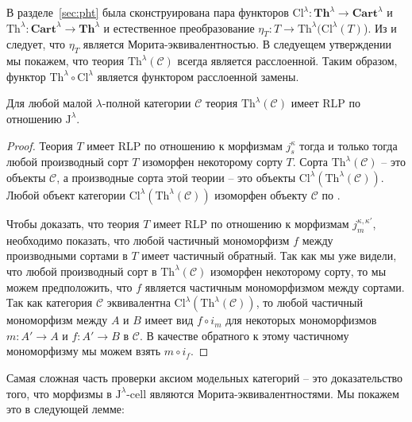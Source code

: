 \documentclass[reqno]{amsart}
\theoremstyle{definition}
\theoremstyle{remark}
\newcommand{\bcat}[1]{\mathbf{#1}}
\newcommand{\cat}[1]{\mathcal{#1}}
\newcommand{\fs}[1]{\mathrm{#1}}
\newcommand{\Th}{\bcat{Th}}
\newcommand{\I}{\mathrm{I}}
\newcommand{\J}{\mathrm{J}}
\newcommand{\class}[2]{#1\text{-}\mathrm{#2}}
\newcommand{\Icell}[1][\I]{\class{#1}{cell}}
\begin{document}
В разделе~\ref{sec:pht} была сконструирована пара функторов $\fs{Cl}^\lambda : \Th^\lambda \to \bcat{Cart}^\lambda$ и $\fs{Th}^\lambda : \bcat{Cart}^\lambda \to \Th^\lambda$ и естественное преобразование $\eta_T : T \to \fs{Th}^\lambda(\fs{Cl}^\lambda(T)$).
Из  и  следует, что $\eta_T$ является Морита-эквивалентностью.
В следуещем утверждении мы покажем, что теория $\fs{Th}^\lambda(\cat{C})$ всегда является расслоенной.
Таким образом, функтор $\fs{Th}^\lambda \circ \fs{Cl}^\lambda$ является функтором расслоенной замены.

\begin{prop}[th-fib]
Для любой малой $\lambda$-полной категории $\cat{C}$ теория $\fs{Th}^\lambda(\cat{C})$ имеет RLP по отношению $\J^\lambda$.
\end{prop}
\begin{proof}
Теория $T$ имеет RLP по отношению к морфизмам $j^\kappa_s$ тогда и только тогда любой производный сорт $T$ изоморфен некоторому сорту $T$.
Сорта $\fs{Th}^\lambda(\cat{C})$ -- это объекты $\cat{C}$, а производные сорта этой теории -- это объекты $\fs{Cl}^\lambda(\fs{Th}^\lambda(\cat{C}))$.
Любой объект категории $\fs{Cl}^\lambda(\fs{Th}^\lambda(\cat{C}))$ изоморфен объекту $\cat{C}$ по .

Чтобы доказать, что теория $T$ имеет RLP по отношению к морфизмам $j_m^{\kappa,\kappa'}$, необходимо показать, что любой частичный мономорфизм $f$ между производными сортами в $T$ имеет частичный обратный.
Так как мы уже видели, что любой производный сорт в $\fs{Th}^\lambda(\cat{C})$ изоморфен некоторому сорту, то мы можем предположить, что $f$ является частичным мономорфизмом между сортами.
Так как категория $\cat{C}$ эквивалентна $\fs{Cl}^\lambda(\fs{Th}^\lambda(\cat{C}))$, то любой частичный мономорфизм между $A$ и $B$ имеет вид $f \circ i_m$ для некоторых мономорфизмов $m : A' \to A$ и $f : A' \to B$ в $\cat{C}$.
В качестве обратного к этому частичному мономорфизму мы можем взять $m \circ i_f$.
\end{proof}

Самая сложная часть проверки аксиом модельных категорий -- это доказательство того, что морфизмы в $\Icell[\J^\lambda]$ являются Морита-эквивалентностями.
Мы покажем это в следующей лемме:
\end{document}
